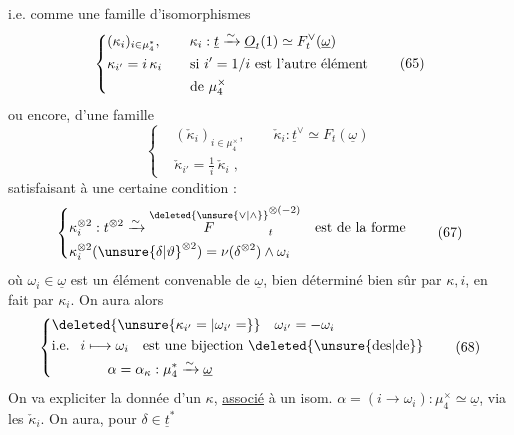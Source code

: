 i.e. comme une famille d'isomorphismes
\[
\left\{\begin{aligned}
&(\kappa_i)_{i\in\mu_4^*},\qquad
\kappa_i:\underline t\xrightarrow{\sim}\underline O_t(1)\simeq F_t^\vee(\underline\omega)\\
&\kappa_{i'}=i\,\kappa_i\qquad\text{si }i'=1/i\text{ est l'autre élément}\\
&\hphantom{\kappa_{i'}=i\,\kappa_i\qquad}\text{de }\mu_4^\times
\end{aligned}\right. \tag*{(65)}
\]
ou encore, d'une famille
\[
\left\{\begin{aligned}
&(\check\kappa_i)_{i\in\mu_4^\times},\qquad \check\kappa_i:\underline t^\vee\simeq F_t(\underline\omega)\\
&\check\kappa_{i'}=\frac1i\,\check\kappa_i\;,
\end{aligned}\right. \tag*{(66)}
\]
satisfaisant à une certaine condition :
\[
\left\{\begin{aligned}
&\kappa_i^{\otimes2}:t^{\otimes2}\xrightarrow{\sim}\overset{\deleted{\unsure{\vee|\wedge}}}{F}_t^{\otimes(-2)}
\quad\text{est de la forme}\\
&\kappa_i^{\otimes2}(\unsure{\delta|\vartheta}^{\otimes2})=\nu(\delta^{\otimes2})\mathbin{\wedge}\omega_i
\end{aligned}\right. \tag*{(67)}
\]
où $\omega_i\in\underline\omega$ est un élément convenable de $\underline\omega$, bien déterminé bien sûr par $\kappa,i$, en fait par $\kappa_i$.
On aura alors
\[
\left\{\begin{aligned}
&\deleted{\unsure{\kappa_{i'}=|\omega_{i'}=}}\quad\omega_{i'}=-\omega_i\\
&\text{i.e. }\ i\longmapsto\omega_i\quad\text{est une bijection }\deleted{\unsure{\text{des}|\text{de}}}\\
&\hspace{4em}\alpha=\alpha_\kappa:\mu_4^*\xrightarrow{\sim}\underline\omega
\end{aligned}\right. \tag*{(68)}
\]
On va expliciter la donnée d'un $\kappa$, \uline{associé} à un isom.    $\alpha=(i\longrightarrow\omega_i):\mu_4^\times\simeq\underline\omega$, via les $\check\kappa_i$. On aura, pour $\delta\in\underline t^*$
